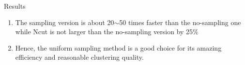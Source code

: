 \documentclass{beamer}
\begin{document}
\begin{frame}{Results}
	\begin{minipage}{0.4\linewidth}
		\scriptsize
		\begin{enumerate}
			\item The sampling version is about 20$\sim$50 times faster than the no-sampling one while Ncut is not larger than the no-sampling version by 25\%
			\item Hence, the uniform sampling method is a good choice for its amazing efficiency and reasonable clustering quality.
		\end{enumerate}
	\end{minipage}
\end{frame}
\end{document}

